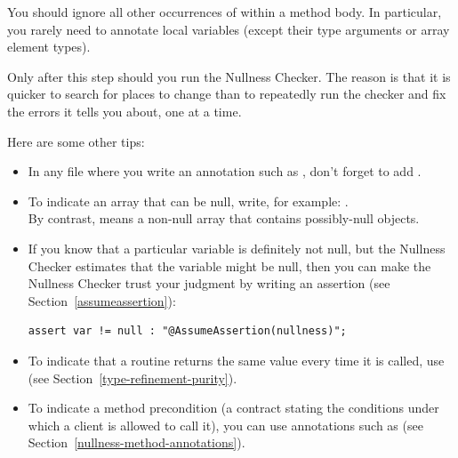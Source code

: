 \noindent
You should ignore all other occurrences of  within a method
body.  In particular, you rarely need to annotate local variables
(except their type arguments or array element types).

Only after this step should you run
the Nullness Checker.  The reason is that it is quicker to search for
places to change than to repeatedly run the checker and fix the errors it
tells you about, one at a time.

Here are some other tips:
\begin{itemize}
\item
    \begin{sloppypar}
    In any file where you write an annotation such as ,
    don't forget to add .
    \end{sloppypar}
\item
    To indicate an array that can be null, write, for example: . \\
    By contrast,  means a non-null array that
    contains possibly-null objects.
\item
    If you know that a particular variable is definitely not null, but the
    Nullness Checker estimates that the variable might be null, then you can
    make the Nullness Checker trust your judgment by writing
    an assertion (see Section~\ref{assumeassertion}):
\begin{Verbatim}
assert var != null : "@AssumeAssertion(nullness)";
\end{Verbatim}
\item
    To indicate that a routine returns the same value every time it is
    called, use  (see Section~\ref{type-refinement-purity}).
\item
    To indicate a method precondition (a contract stating the conditions
    under which a client is allowed to call it), you can use annotations
    such as  (see Section~\ref{nullness-method-annotations}).
\end{itemize}




\newcommand{\linktoNonNull}{\refclass{checker/nullness/qual}{NonNull}}
\newcommand{\linktoNullable}{\refclass{checker/nullness/qual}{Nullable}}

